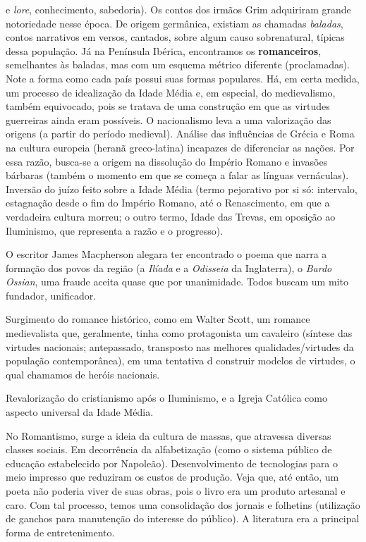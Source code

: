 \documentclass[12pt]{book}
\begin{document}
\begin{enumerate}
e \textit{lore}, conhecimento, sabedoria). Os contos dos irmãos Grim adquiriram grande notoriedade nesse época. De origem germânica, existiam as chamadas \textit{baladas}, contos narrativos em versos, cantados, sobre algum causo sobrenatural, típicas dessa população. Já na Península Ibérica, encontramos os \textbf{romanceiros}, semelhantes às baladas, mas com um esquema métrico diferente (proclamadas). Note a forma como cada país possui suas formas populares. Há, em certa medida, um processo de idealização da Idade Média e, em especial, do medievalismo, também equivocado, pois se tratava de uma construção em que as virtudes guerreiras ainda eram possíveis. O nacionalismo leva a uma valorização das origens (a partir do período medieval). Análise das influências de Grécia e Roma na cultura europeia (heranã greco-latina) incapazes de diferenciar as nações. Por essa razão, busca-se a origem na dissolução do Império Romano e invasões bárbaras (também o momento em que se começa a falar as línguas vernáculas). Inversão do juízo feito sobre a Idade Média (termo pejorativo por si só: intervalo, estagnação desde o fim do Império Romano, até o Renascimento, em que a verdadeira cultura morreu; o outro termo, Idade das Trevas, em oposição ao Iluminismo, que representa a razão e o progresso).
			\par O escritor James Macpherson alegara ter encontrado o poema que narra a formação dos povos da região (a \textit{Ilíada} e a \textit{Odisseia} da Inglaterra), o \textit{Bardo Ossian}, uma fraude aceita quase que por unanimidade. Todos buscam um mito fundador, unificador.
			\par Surgimento do romance histórico, como em Walter Scott, um romance medievalista que, geralmente, tinha como protagonista um cavaleiro (síntese das virtudes nacionais; antepassado, transposto nas melhores qualidades/virtudes da população contemporânea), em uma tentativa d construir modelos de virtudes, o qual chamamos de heróis nacionais.
			\par Revalorização do cristianismo após o Iluminismo, e a Igreja Católica como aspecto universal da Idade Média.
			\par No Romantismo, surge a ideia da cultura de massas, que atravessa diversas classes sociais. Em decorrência da alfabetização (como o sistema público de educação estabelecido por Napoleão). Desenvolvimento de tecnologias para o meio impresso que reduziram os custos de produção. Veja que, até então, um poeta não poderia viver de suas obras, pois o livro era um produto artesanal e caro. Com tal processo, temos uma consolidação dos jornais e folhetins (utilização de ganchos para manutenção do interesse do público). A literatura era a principal forma de entretenimento.

\end{enumerate}
\end{document}
